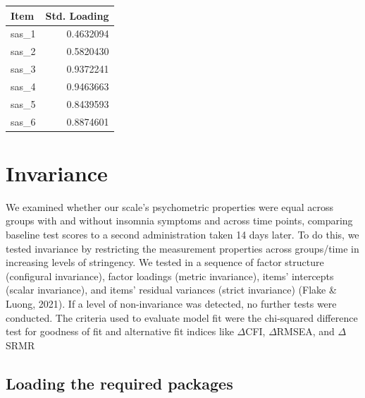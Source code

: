 \documentclass[
  letterpaper,
  DIV=11,
  numbers=noendperiod]{scrreprt}
\newenvironment{Shaded}{\begin{snugshade}}{\end{snugshade}}
\newcommand{\AttributeTok}[1]{\textcolor[rgb]{0.40,0.45,0.13}{#1}}
\newcommand{\FunctionTok}[1]{\textcolor[rgb]{0.28,0.35,0.67}{#1}}
\newcommand{\NormalTok}[1]{\textcolor[rgb]{0.00,0.23,0.31}{#1}}
\newcommand{\SpecialCharTok}[1]{\textcolor[rgb]{0.37,0.37,0.37}{#1}}
\newcommand{\StringTok}[1]{\textcolor[rgb]{0.13,0.47,0.30}{#1}}
\begin{document}
\begin{Shaded}
\end{Shaded}

\begin{tabular}[t]{l|r}
\hline
Item & Std. Loading\\
\hline
sas\_1 & 0.4632094\\
\hline
sas\_2 & 0.5820430\\
\hline
sas\_3 & 0.9372241\\
\hline
sas\_4 & 0.9463663\\
\hline
sas\_5 & 0.8439593\\
\hline
sas\_6 & 0.8874601\\
\hline
\end{tabular}


\hypertarget{invariance}{%
\chapter{Invariance}\label{invariance}}

We examined whether our scale's psychometric properties were equal
across groups with and without insomnia symptoms and across time points,
comparing baseline test scores to a second administration taken 14 days
later. To do this, we tested invariance by restricting the measurement
properties across groups/time in increasing levels of stringency. We
tested in a sequence of factor structure (configural invariance), factor
loadings (metric invariance), items' intercepts (scalar invariance), and
items' residual variances (strict invariance) (Flake \& Luong, 2021). If
a level of non-invariance was detected, no further tests were conducted.
The criteria used to evaluate model fit were the chi-squared difference
test for goodness of fit and alternative fit indices like \(\Delta\)CFI,
\(\Delta\)RMSEA, and \(\Delta\)SRMR

\hypertarget{loading-the-required-packages-2}{%
\section{Loading the required
packages}\label{loading-the-required-packages-2}}
\end{document}
